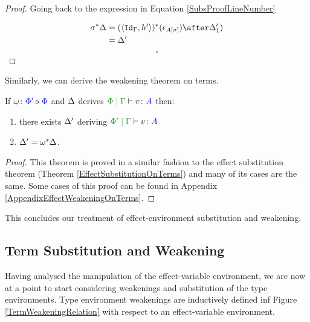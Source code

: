 \documentclass{Report}
\begin{document}
\begin{framed}
\begin{proof}
    Going back to the expression in Equation \ref{SubsProofLineNumber}
    
    \begin{align*}
        \si\star{\D} & = (\pr{\Id{\G}}{h'})\star(\e_{A\ssi})\after\D_1')\\
        & = \D'
    \end{align*}
    $$\square$$
    \end{proof}
    
\end{framed}

Similarly, we can derive the weakening theorem on terms.


\begin{framed}
    \begin{theorem}\label{EffectWeakeningOnTerms}
        If $\omega \colon {\color{blue}\Phi'} \triangleright {\color {blue} \Phi}$ and $\Delta$ derives $\gpetyperelation{v}{A}$ then:
        \begin{enumerate}[label=\roman*.]
            \item there exists $\Delta'$ deriving $\etyperelation{\P'}{\G}{v}{A}$ 
            \item $\Delta' = \omega^*\Delta$.
        \end{enumerate}
    \end{theorem}
    
    \begin{proof}
        This theorem is proved in a similar fashion to the effect substitution theorem (Theorem \ref{EffectSubstitutionOnTerms}) and many of its cases are the same. Some cases of this proof can be found in Appendix \ref{AppendixEffectWeakeningOnTerms}.
    \end{proof}
\end{framed}

This concludes our treatment of effect-environment substitution and weakening.

\subsection{Term Substitution and Weakening}

Having analysed the manipulation of the effect-variable environment, we are now at a point to start considering weakenings and substitution of the type environments. Type environment weakenings are inductively defined inf Figure \ref{TermWeakeningRelation} with respect to an effect-variable environment.
\end{document}

